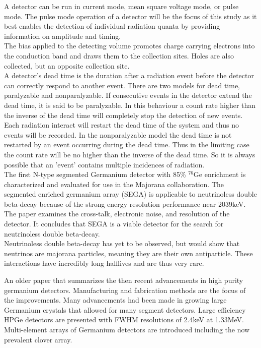 \documentclass[12pt]{article}
\begin{document}
\begin{doublespacing}
A detector can be run in current mode, mean square voltage mode, or pulse mode. 
The pulse mode operation of a detector will be the focus of this study as it best enables the detection of individual radiation quanta by providing information on amplitude and timing.
\\

The bias applied to the detecting volume promotes charge carrying electrons into the conduction band and draws them to the collection sites. 
Holes are also collected, but an opposite collection site.
\\

A detector's dead time is the duration after a radiation event before the detector can correctly respond to another event.
There are two models for dead time, paralyzable and nonparalyzable. 
If consecutive events in the detector extend the dead time, it is said to be paralyzable. 
In this behaviour a count rate higher than the inverse of the dead time will completely stop the detection of new events. 
Each radiation interact will restart the dead time of the system and thus no events will be recorded. 
In the nonparalyzable model the dead time is not restarted by an event occurring during the dead time. 
Thus in the limiting case the count rate will be no higher than the inverse of the dead time.
So it is always possible that an 'event' contains multiple incidences of radiation.
\\



\textbf{\cite{Leviner201466}}
The first N-type segmented Germanium detector with 85\% $^{76}\mbox{Ge}$ enrichment is characterized and evaluated for use in the Majorana collaboration.
The segmented enriched germanium array (SEGA) is applicable to neutrinoless double beta-decay because of the strong energy resolution performance near 2039keV.
The paper examines the cross-talk, electronic noise, and resolution of the detector.
It concludes that SEGA is a viable detector for the search for neutrinoless double beta-decay.
\\

Neutrinoless double beta-decay has yet to be observed, but would show that neutrinos are majorana particles, meaning they are their own antiparticle.
These interactions have incredibly long halflives and are thus very rare.


\textbf{\cite{Sangsingkeow2003183}}
An older paper that summarizes the then recent advancements in high purity germanium detectors.
Manufacturing and fabrication methods are the focus of the improvements.
Many advancements had been made in growing large Germanium crystals that allowed for many segment detectors.
Large efficiency HPGe detectors are presented with FWHM resolutions of 2.4keV at 1.33MeV.
Multi-element arrays of Germanium detectors are introduced including the now prevalent clover array.
\\


\end{doublespacing}
\end{document}
